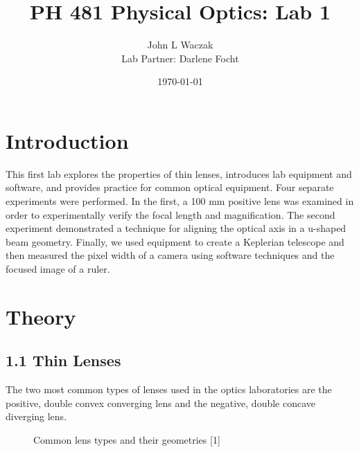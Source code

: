 \documentclass[letter, 11pt, onecolumn]{article}
\title{\vspace{-2.0cm}PH 481 Physical Optics: Lab 1 }
\author{John L Waczak \\ Lab Partner: Darlene Focht}
\date{\today}
\begin{document}
	\maketitle
	
	\section*{Introduction}
		 This first lab explores the properties of thin lenses, introduces lab equipment and software, and provides practice for common optical equipment. Four separate experiments were performed. In the first, a 100 mm positive lens was examined in order to experimentally verify the focal length and magnification. The second experiment demonstrated a technique for aligning the optical axis in a u-shaped beam geometry. Finally, we used equipment to create a Keplerian telescope and then measured the pixel width of a camera using software techniques and the focused image of a ruler. 
	
	\section*{Theory} 
		\subsection*{1.1 Thin Lenses} 
		The two most common types of lenses used in the optics laboratories are the positive, double convex converging lens and the negative, double concave diverging lens. \\
			\begin{figure}[h!]
				\centering
				\caption{Common lens types and their geometries [1]}
			\end{figure} 
		
\end{document}
